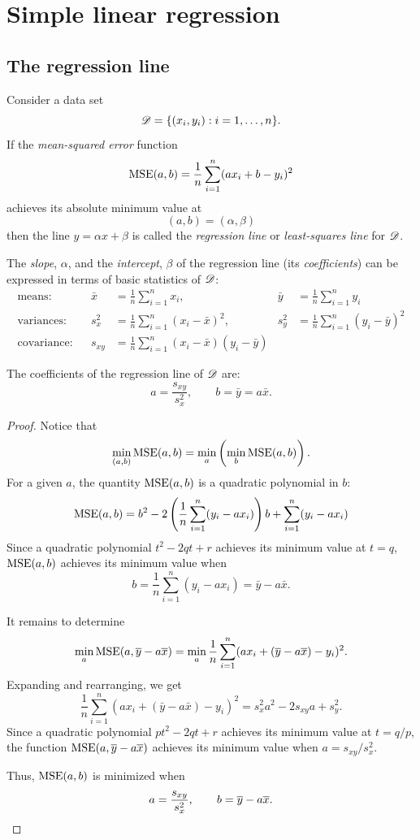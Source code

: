 \documentclass[12pt]{amsart}
\begin{document}
\section{Simple linear regression}

\subsection{The regression line}
Consider a data set
\[
    \cD=\{(x_i, y_i):i=1,\ldots,n\}.
\]
If the \emph{mean-squared error} function
\[
    \MSE(a,b) = \frac1n\sum_{i=1}^n (a x_i + b - y_i)^2
\]
achieves its absolute minimum value at \[(a,b)=(\alpha, \beta)\] then the line $y=\alpha x+\beta$
is called the \emph{regression line} or \emph{least-squares line} for $\cD$.

The \emph{slope}, $\alpha$, and the \emph{intercept}, $\beta$ of the regression line (its \emph{coefficients}) can be expressed
in terms of basic statistics of $\cD$:
\begin{align*}
    \text{means:}& &\bar{x} &= \frac1n\sum_{i=1}^n x_i,& \bar{y} &= \frac1n\sum_{i=1}^n y_i\\
    \text{variances:}& &s_x^2 &= \frac1n\sum_{i=1}^n (x_i - \bar{x})^2,& s_y^2 &= \frac1n\sum_{i=1}^n (y_i-\bar{y})^2\\
    \text{covariance:}& &s_{xy} &= \frac1n\sum_{i=1}^n (x_i - \bar{x})(y_i-\bar{y})
\end{align*}

\begin{theorem}\label{T:GaussLegendre}
The coefficients of the regression line of $\cD$ are:
\[
    a=\frac{s_{xy}}{s_x^2},\qquad b=\bar y = a\bar x.
\]
\end{theorem}
\begin{proof}
    Notice that
    \[
        \min_{(a,b)}
        \MSE(a,b) = \min_a\left(\min_b\MSE(a,b)\right).
    \]
    For a given $a$, the quantity $\MSE(a, b)$ is a quadratic polynomial in $b$:
    \[
        \MSE(a, b)=b^2 - 2\left(\frac1n\sum_{i=1}^n(y_i-ax_i)\right)b + \sum_{i=1}^n(y_i-ax_i)
    \]
    Since a quadratic polynomial $t^2-2qt+r$ achieves its minimum value at $t=q$,
    $\MSE(a, b)$ achieves its minimum value when
    \[
        b=\frac1n\sum_{i=1}^n(y_i-ax_i) = \bar{y}-a\bar{x}.
    \]

    It remains to determine
    \[
        \min_a\MSE(a, \bar y - a\bar x)
        =\min_a \frac1n\sum_{i=1}^n (ax_i + (\bar{y}-a\bar{x}) - y_i)^2.
    \]
    Expanding and rearranging, we get
    \[
        \frac1n\sum_{i=1}^n (ax_i + (\bar{y}-a\bar{x}) - y_i)^2 = s_x^2 a^2 - 2s_{xy}a + s_y^2.
    \]
    Since a quadratic polynomial $pt^2-2qt+r$ achieves its minimum value at $t=q/p$,
    the function $\MSE(a, \bar y - a\bar x)$ achieves its minimum value when $a=s_{xy}/s_x^2$.
    
    Thus, $\MSE(a, b)$ is minimized when
    \[
        a=\frac{s_{xy}}{s_x^2},\qquad b=\bar y - a\bar x.\qedhere
    \]
\end{proof}
\end{document}

